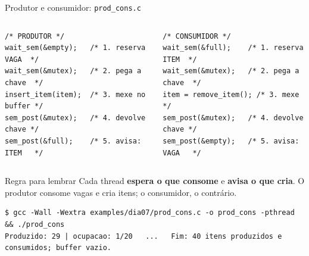 \documentclass[aspectratio=169]{beamer}
\begin{document}
\begin{frame}[fragile]{Produtor e consumidor: \texttt{prod\_cons.c}}
\begin{columns}[T]
\begin{lstlisting}[style=codigo, basicstyle=\ttfamily\scriptsize\color{termfg}]
/* PRODUTOR */
wait_sem(&empty);   /* 1. reserva VAGA  */
wait_sem(&mutex);   /* 2. pega a chave  */
insert_item(item);  /* 3. mexe no buffer */
sem_post(&mutex);   /* 4. devolve chave */
sem_post(&full);    /* 5. avisa: ITEM   */
\end{lstlisting}

\begin{lstlisting}[style=codigo, basicstyle=\ttfamily\scriptsize\color{termfg}]
/* CONSUMIDOR */
wait_sem(&full);    /* 1. reserva ITEM  */
wait_sem(&mutex);   /* 2. pega a chave  */
item = remove_item(); /* 3. mexe       */
sem_post(&mutex);   /* 4. devolve chave */
sem_post(&empty);   /* 5. avisa: VAGA   */
\end{lstlisting}
\end{columns}

\vspace{0.4em}
\begin{exampleblock}{Regra para lembrar}
Cada thread \textbf{espera o que consome} e \textbf{avisa o que cria}. O produtor consome vagas e cria itens; o consumidor, o contrário.
\end{exampleblock}

\begin{lstlisting}[style=terminal, basicstyle=\ttfamily\scriptsize\color{termfg}]
$ gcc -Wall -Wextra examples/dia07/prod_cons.c -o prod_cons -pthread && ./prod_cons
Produzido: 29 | ocupacao: 1/20   ...   Fim: 40 itens produzidos e consumidos; buffer vazio.
\end{lstlisting}
\end{frame}
\end{document}

